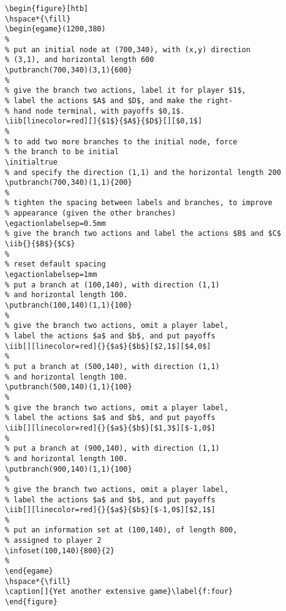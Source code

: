 \documentclass[12pt]{article}
\begin{document}
\begin{verbatim}
\begin{figure}[htb]
\hspace*{\fill}
\begin{egame}(1200,380)
%
% put an initial node at (700,340), with (x,y) direction
% (3,1), and horizontal length 600
\putbranch(700,340)(3,1){600}
%
% give the branch two actions, label it for player $1$,
% label the actions $A$ and $D$, and make the right-
% hand node terminal, with payoffs $0,1$.
\iib[linecolor=red][]{$1$}{$A$}{$D$}[][$0,1$]
%
% to add two more branches to the initial node, force
% the branch to be initial
\initialtrue
% and specify the direction (1,1) and the horizontal length 200
\putbranch(700,340)(1,1){200}
%
% tighten the spacing between labels and branches, to improve
% appearance (given the other branches)
\egactionlabelsep=0.5mm
% give the branch two actions and label the actions $B$ and $C$
\iib{}{$B$}{$C$}
%
% reset default spacing
\egactionlabelsep=1mm
% put a branch at (100,140), with direction (1,1)
% and horizontal length 100.
\putbranch(100,140)(1,1){100}
%
% give the branch two actions, omit a player label,
% label the actions $a$ and $b$, and put payoffs
\iib[][linecolor=red]{}{$a$}{$b$}[$2,1$][$4,0$]
%
% put a branch at (500,140), with direction (1,1)
% and horizontal length 100.
\putbranch(500,140)(1,1){100}
%
% give the branch two actions, omit a player label,
% label the actions $a$ and $b$, and put payoffs
\iib[][linecolor=red]{}{$a$}{$b$}[$1,3$][$-1,0$]
%
% put a branch at (900,140), with direction (1,1)
% and horizontal length 100.
\putbranch(900,140)(1,1){100}
%
% give the branch two actions, omit a player label,
% label the actions $a$ and $b$, and put payoffs
\iib[][linecolor=red]{}{$a$}{$b$}[$-1,0$][$2,1$]
%
% put an information set at (100,140), of length 800,
% assigned to player 2
\infoset(100,140){800}{2}
%
\end{egame}
\hspace*{\fill}
\caption[]{Yet another extensive game}\label{f:four}
\end{figure}
\end{verbatim}
\end{document}

